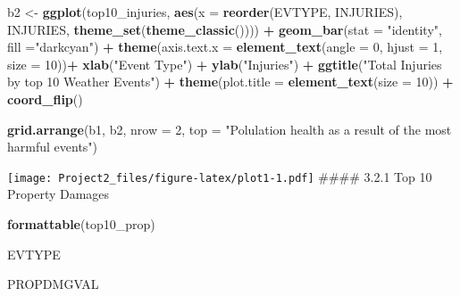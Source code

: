 \documentclass[]{article}
\newenvironment{Shaded}{\begin{snugshade}}{\end{snugshade}}
\newcommand{\DataTypeTok}[1]{\textcolor[rgb]{0.13,0.29,0.53}{#1}}
\newcommand{\DecValTok}[1]{\textcolor[rgb]{0.00,0.00,0.81}{#1}}
\newcommand{\KeywordTok}[1]{\textcolor[rgb]{0.13,0.29,0.53}{\textbf{#1}}}
\newcommand{\NormalTok}[1]{#1}
\newcommand{\OperatorTok}[1]{\textcolor[rgb]{0.81,0.36,0.00}{\textbf{#1}}}
\newcommand{\StringTok}[1]{\textcolor[rgb]{0.31,0.60,0.02}{#1}}
\begin{document}
\begin{Shaded}
\begin{Highlighting}[]
\NormalTok{b2 <-}\StringTok{ }\KeywordTok{ggplot}\NormalTok{(top10_injuries, }\KeywordTok{aes}\NormalTok{(}\DataTypeTok{x =}  \KeywordTok{reorder}\NormalTok{(EVTYPE, INJURIES), INJURIES, }\KeywordTok{theme_set}\NormalTok{(}\KeywordTok{theme_classic}\NormalTok{()))) }\OperatorTok{+}\StringTok{ }
\StringTok{        }\KeywordTok{geom_bar}\NormalTok{(}\DataTypeTok{stat =} \StringTok{"identity"}\NormalTok{, }\DataTypeTok{fill =}\StringTok{"darkcyan"}\NormalTok{) }\OperatorTok{+}\StringTok{ }
\StringTok{        }\KeywordTok{theme}\NormalTok{(}\DataTypeTok{axis.text.x =} \KeywordTok{element_text}\NormalTok{(}\DataTypeTok{angle =} \DecValTok{0}\NormalTok{, }\DataTypeTok{hjust =} \DecValTok{1}\NormalTok{, }\DataTypeTok{size =} \DecValTok{10}\NormalTok{))}\OperatorTok{+}
\StringTok{        }\KeywordTok{xlab}\NormalTok{(}\StringTok{"Event Type"}\NormalTok{) }\OperatorTok{+}\StringTok{ }\KeywordTok{ylab}\NormalTok{(}\StringTok{"Injuries"}\NormalTok{) }\OperatorTok{+}\StringTok{ }\KeywordTok{ggtitle}\NormalTok{(}\StringTok{"Total Injuries by top 10 Weather Events"}\NormalTok{) }\OperatorTok{+}
\StringTok{        }\KeywordTok{theme}\NormalTok{(}\DataTypeTok{plot.title =} \KeywordTok{element_text}\NormalTok{(}\DataTypeTok{size =} \DecValTok{10}\NormalTok{)) }\OperatorTok{+}\StringTok{ }\KeywordTok{coord_flip}\NormalTok{()}
\end{Highlighting}
\end{Shaded}

\begin{Shaded}
\begin{Highlighting}[]
       \KeywordTok{grid.arrange}\NormalTok{(b1, b2, }\DataTypeTok{nrow =} \DecValTok{2}\NormalTok{, }\DataTypeTok{top =} \StringTok{"Polulation health as a result of the most harmful events"}\NormalTok{)}
\end{Highlighting}
\end{Shaded}

\texttt{[image: Project2\_files/figure-latex/plot1-1.pdf]} \#\#\#\# 3.2.1
Top 10 Property Damages

\begin{Shaded}
\begin{Highlighting}[]
\KeywordTok{formattable}\NormalTok{(top10_prop)}
\end{Highlighting}
\end{Shaded}

EVTYPE

PROPDMGVAL
\end{document}
